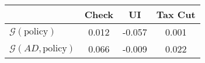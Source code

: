 \begin{tabular}{@{}lccc@{}} 
\toprule 
                          & Check      & UI    & Tax Cut    \\  \midrule 
$\mathcal{G}(\text{policy})$ & 0.012  & -0.057  & 0.001     \\ 
$\mathcal{G}(AD,\text{policy})$ & 0.066  & -0.009  & 0.022     \\ 
\end{tabular}  

